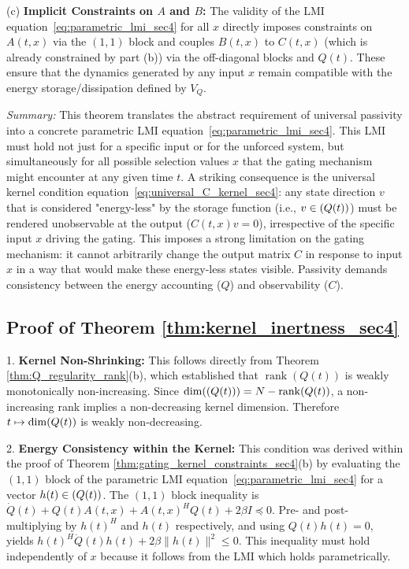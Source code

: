 \documentclass[10pt]{article} %
\def\eqref#1{equation~\ref{#1}}
\let\ker\relax\DeclareMathOperator{\ker}{Ker}           %
\DeclareMathOperator{\rank}{rank}                       %
\theoremstyle{definition}
\begin{document}
(c) \textbf{Implicit Constraints on $A$ and $B$:} The validity of the LMI \eqref{eq:parametric_lmi_sec4} for all $x$ directly imposes constraints on $A(t,x)$ via the $(1,1)$ block and couples $B(t,x)$ to $C(t,x)$ (which is already constrained by part (b)) via the off-diagonal blocks and $Q(t)$. These ensure that the dynamics generated by any input $x$ remain compatible with the energy storage/dissipation defined by $V_Q$.

\textit{Summary:} This theorem translates the abstract requirement of universal passivity into a concrete parametric LMI \eqref{eq:parametric_lmi_sec4}. This LMI must hold not just for a specific input or for the unforced system, but simultaneously for all possible selection values $x$ that the gating mechanism might encounter at any given time $t$. A striking consequence is the universal kernel condition \eqref{eq:universal_C_kernel_sec4}: any state direction $v$ that is considered "energy-less" by the storage function (i.e., $v \in \ker(Q(t))$) must be rendered unobservable at the output ($C(t,x)v = 0$), irrespective of the specific input $x$ driving the gating. This imposes a strong limitation on the gating mechanism: it cannot arbitrarily change the output matrix $C$ in response to input $x$ in a way that would make these energy-less states visible. Passivity demands consistency between the energy accounting ($Q$) and observability ($C$).

\subsection{Proof of Theorem \ref{thm:kernel_inertness_sec4}}
\label{subsec:inertness}
1.  \textbf{Kernel Non-Shrinking:} This follows directly from Theorem \ref{thm:Q_regularity_rank}(b), which established that $\rank(Q(t))$ is weakly monotonically non-increasing. Since $\dim(\ker(Q(t))) = N - \rank(Q(t))$, a non-increasing rank implies a non-decreasing kernel dimension. Therefore $t\mapsto \dim\ker(Q(t))$ is weakly non-decreasing.

2.  \textbf{Energy Consistency within the Kernel:} This condition was derived within the proof of Theorem \ref{thm:gating_kernel_constraints_sec4}(b) by evaluating the $(1,1)$ block of the parametric LMI \eqref{eq:parametric_lmi_sec4} for a vector $h(t) \in \ker(Q(t))$. The $(1,1)$ block inequality is $\dot Q(t) + Q(t) A(t,x) + A(t,x)^H Q(t) + 2\beta I \preceq 0$. Pre- and post-multiplying by $h(t)^H$ and $h(t)$ respectively, and using $Q(t)h(t)=0$, yields $h(t)^H \dot Q(t) h(t) + 2\beta \|h(t)\|^2 \le 0$. This inequality must hold independently of $x$ because it follows from the LMI which holds parametrically.
\end{document}
